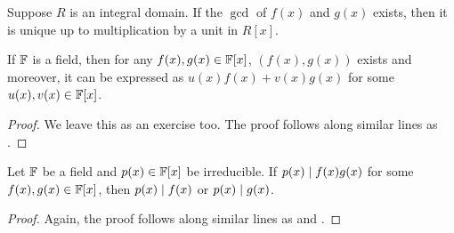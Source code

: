 \begin{rem}
    Suppose $R$ is an integral domain. If the $\gcd$ of $f(x)$ and $g(x)$ exists, then it is unique up to multiplication by a unit in $R[x]$.
\end{rem}
\begin{lem}
    If $\mathbb{F}$ is a field, then for any $f(x), g(x) \in \mathbb{F}[x]$, $\left( f(x), g(x) \right)$ exists and moreover, it can be expressed as $u(x)f(x) + v(x)g(x)$ for some $u(x),v(x) \in \mathbb{F}[x]$.
\end{lem}
\begin{proof}
    We leave this as an exercise too. The proof follows along similar lines as .
\end{proof}
\begin{cor}
    Let $\mathbb{F}$ be a field and $p(x) \in \mathbb{F}[x]$ be irreducible. If $p(x) \mid f(x)g(x)$ for some $f(x), g(x) \in \mathbb{F}[x]$, then $p(x) \mid f(x)$ or $p(x) \mid g(x)$.
\end{cor}
\begin{proof}
    Again, the proof follows along similar lines as  and .
\end{proof}

